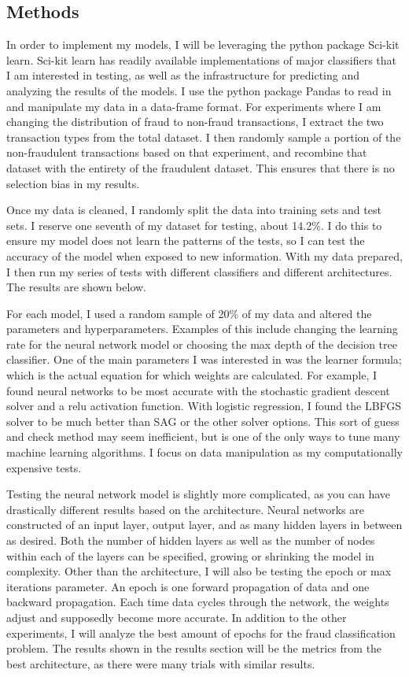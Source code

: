 \documentclass[midd]{thesis}
\begin{document}
\subsection{Methods}

In order to implement my models, I will be leveraging the python package Sci-kit learn. Sci-kit learn has readily available implementations of major classifiers that I am interested in testing, as well as the infrastructure for predicting and analyzing the results of the models. I use the python package Pandas to read in and manipulate my data in a data-frame format. For experiments where I am changing the distribution of fraud to non-fraud transactions, I extract the two transaction types from the total dataset. I then randomly sample a portion of the non-fraudulent transactions based on that experiment, and recombine that dataset with the entirety of the fraudulent dataset. This ensures that there is no selection bias in my results. 

Once my data is cleaned, I randomly split the data into training sets and test sets. I reserve one seventh of my dataset for testing, about 14.2\%. I do this to ensure my model does not learn the patterns of the tests, so I can test the accuracy of the model when exposed to new information. With my data prepared, I then run my series of tests with different classifiers and different architectures. The results are shown below. 

For each model, I used a random sample of 20\% of my data and altered the parameters and hyperparameters. Examples of this include changing the learning rate for the neural network model or choosing the max depth of the decision tree classifier. One of the main parameters I was interested in was the learner formula; which is the actual equation for which weights are calculated. For example, I found neural networks to be most accurate with the stochastic gradient descent solver and a relu activation function. With logistic regression, I found the LBFGS solver to be much better than SAG or the other solver options. This sort of guess and check method may seem inefficient, but is one of the only ways to tune many machine learning algorithms. I focus on data manipulation as my computationally expensive tests. 


Testing the neural network model is slightly more complicated, as you can have drastically different results based on the architecture. Neural networks are constructed of an input layer, output layer, and as many hidden layers in between as desired. Both the number of hidden layers as well as the number of nodes within each of the layers can be specified, growing or shrinking the model in complexity. Other than the architecture, I will also be testing the epoch or max iterations parameter. An epoch is one forward propagation of data and one backward propagation. Each time data cycles through the network, the weights adjust and supposedly become more accurate. In addition to the other experiments, I will analyze the best amount of epochs for the fraud classification problem. The results shown in the results section will be the metrics from the best architecture, as there were many trials with similar results.
\end{document}
